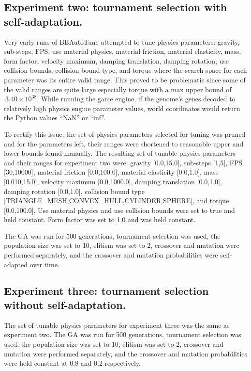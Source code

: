 \subsection[Experiment Two]{Experiment two: tournament selection with self-adaptation.}

Very early runs of BBAutoTune attempted to tune physics parameters: gravity, sub-steps, FPS, use material physics, material friction, material elasticity, mass, form factor, velocity maximum, damping translation, damping rotation, use collision bounds, collision bound type, and torque where the search space for each parameter was its entire valid range. This proved to be problematic since some of the valid ranges are quite large especially torque with a max upper bound of $~3.40\times10^{38}$. While running the game engine, if the genome's genes decoded to relatively high physics engine parameter values, world coordinates would return the Python values ``NaN'' or ``inf''.

To rectify this issue, the set of physics parameters selected for tuning was pruned and for the parameters left, their ranges were shortened to reasonable upper and lower bounds found manually. The resulting set of tunable physics parameters and their ranges for experiment two were: gravity [0.0,15.0], sub-steps [1,5], FPS [30,10000], material friction [0.0,100.0], material elasticity [0.0,1.0], mass [0.010,15.0], velocity maximum [0.0,1000.0], damping translation [0.0,1.0], damping rotation [0.0,1.0], collision bound type [TRIANGLE\_MESH,CONVEX\_HULL,CYLINDER,SPHERE], and torque [0.0,100.0]. Use material physics and use collision bounds were set to true and held constant. Form factor was set to 1.0 and was held constant. 

The GA was run for 500 generations, tournament selection was used, the population size was set to 10, elitism was set to 2, crossover and mutation were performed separately, and the crossover and mutation probabilities were self-adapted over time.

\subsection[Experiment Three]{Experiment three: tournament selection without self-adaptation.}

The set of tunable physics parameters for experiment three was the same as experiment two. The GA was run for 500 generations, tournament selection was used, the population size was set to 10, elitism was set to 2, crossover and mutation were performed separately, and the crossover and mutation probabilities were held constant at 0.8 and 0.2 respectively.

